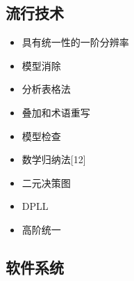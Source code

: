 \subsection{流行技术}
\begin{itemize}
\item 具有统一性的一阶分辨率
\item 模型消除
\item 分析表格法
\item 叠加和术语重写
\item 模型检查
\item 数学归纳法[12]
\item 二元决策图
\item DPLL
\item 高阶统一
\end{itemize}

\subsection{软件系统}
